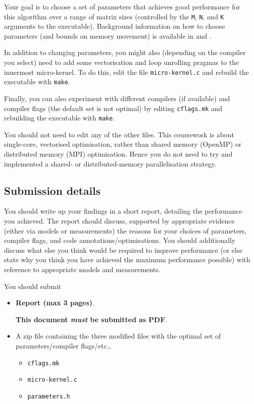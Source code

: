 \documentclass[a4paper]{article}
\begin{document}
Your goal is to choose a set of parameters that achieves good
performance for this algorithm over a range of matrix sizes
(controlled by the \texttt{M}, \texttt{N}, and \texttt{K} arguments to
the executable). Background information on how to choose
parameters (and bounds on memory movement) is available in
\textcite{Low:2016} and \textcite{Smith:2017}.

In addition to changing parameters, you might also (depending on the
compiler you select) need to add some vectorisation and loop unrolling
pragmas to the innermost micro-kernel. To do this, edit the file
\texttt{micro-kernel.c} and rebuild the executable with \texttt{make}.

Finally, you can also experiment with different compilers (if
available) and compiler flags (the default set is not optimal) by
editing \texttt{cflags.mk} and rebuilding the executable with
\texttt{make}.

You should not need to edit any of the other files. This coursework is
about single-core, vectorised optimisation, rather than shared memory
(OpenMP) or distributed memory (MPI) optimisation. Hence you do not
need to try and implemented a shared- or distributed-memory
parallelisation strategy.

\pagebreak
\subsection{Submission details}
\label{sec:submission}

You should write up your findings in a short report, detailing the
performance you achieved. The report should discuss, supported by
appropriate evidence (either via models or measurements) the reasons
for your choices of parameters, compiler flags, and code
annotations/optimisations. You should additionally discuss what else
you think would be required to improve performance (or else state why
you think you have achieved the maximum performance possible) with
reference to appropriate models and measurements.

You should submit

\begin{itemize}
\item \textbf{Report (max 3 pages)}.

  \textbf{This document \emph{must} be submitted as PDF}.

  
\item A zip file containing the three modified files with the optimal set of
  parameters/compiler flags/etc\dots
  \begin{itemize}
  \item \texttt{cflags.mk}
  \item \texttt{micro-kernel.c}
  \item \texttt{parameters.h}
  \end{itemize}
\end{itemize}
\end{document}
